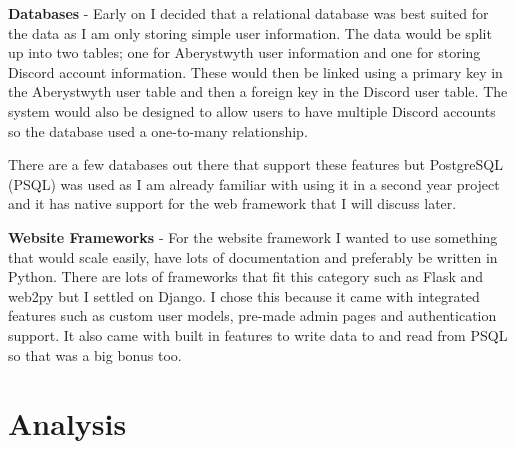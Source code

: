 \textbf{Databases} - Early on I decided that a relational database was best suited for the data as I am only storing simple user information. The data would be split up into two tables; one for Aberystwyth user information and one for storing Discord account information. These would then be linked using a primary key in the Aberystwyth user table and then a foreign key in the Discord user table. The system would also be designed to allow users to have multiple Discord accounts so the database used a one-to-many relationship. 

There are a few databases out there that support these features but PostgreSQL (PSQL) \cite{psql} was used as I am already familiar with using it in a second year project and it has native support for the web framework that I will discuss later.

\textbf{Website Frameworks} - For the website framework I wanted to use something that would scale easily, have lots of documentation and preferably be written in Python. There are lots of frameworks that fit this category such as Flask and web2py but I settled on Django. I chose this because it came with integrated features such as custom user models, pre-made admin pages and authentication support. It also came with built in features to write data to and read from PSQL \cite{psql} so that was a big bonus too.


\section{Analysis}
%
%
%

